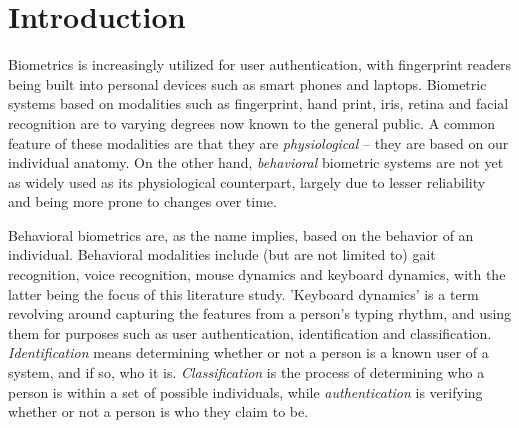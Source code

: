 \documentclass[informationsecurity]{gucmasterproject}
\begin{document}
\thesisdate{\gucmasterthesisdate}
\makefrontpages %





\begin{abstract}


\end{abstract}


\tableofcontents

\chapter{Introduction}
Biometrics is increasingly utilized for user authentication, with fingerprint readers being built into personal devices such as smart phones and laptops.
Biometric systems based on modalities such as fingerprint, hand print, iris, retina and facial recognition are to varying degrees now known to the general public.
A common feature of these modalities are that they are \textit{physiological} -- they are based on our individual anatomy.
On the other hand, \textit{behavioral} biometric systems are not yet as widely used as its physiological counterpart, largely due to lesser reliability and being more prone to changes over time.

Behavioral biometrics are, as the name implies, based on the behavior of an individual. Behavioral modalities include (but are not limited to) gait recognition, voice recognition, mouse dynamics and keyboard dynamics, with the latter being the focus of this literature study.
'Keyboard dynamics' is a term revolving around capturing the features from a person's typing rhythm, and using them for purposes such as user authentication, identification and classification.
\textit{Identification} means determining whether or not a person is a known user of a system, and if so, who it is.
\textit{Classification} is the process of determining who a person is within a set of possible individuals, while \textit{authentication} is verifying whether or not a person is who they claim to be.
\end{document}
